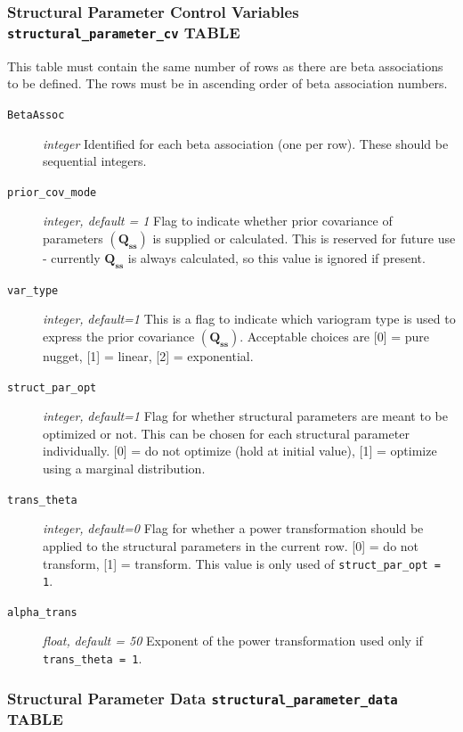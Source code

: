 \documentclass[11pt,oneside,onecolumn]{usgsreport}
\begin{document}
\begin{appendix}
\subsubsection{Structural Parameter Control Variables \texttt{structural\_parameter\_cv}
TABLE}

This table must contain the same number of rows as there are beta
associations to be defined. The rows must be in ascending order of
beta association numbers.
\begin{description}
\item [{\texttt{BetaAssoc}}] \emph{integer }Identified for each beta association
(one per row). These should be sequential integers.
\item [{\texttt{prior\_cov\_mode}}] \emph{integer, default = 1 }Flag to
indicate whether prior covariance of parameters $\left(\mathbf{Q}_{\mathbf{ss}}\right)$
is supplied or calculated. This is reserved for future use - currently
$\mathbf{Q_{ss}}$ is always calculated, so this value is ignored
if present. 
\item [{\texttt{var\_type}}] \emph{integer, }\textit{default=1}\emph{ }This
is a flag to indicate which variogram type is used to express the
prior covariance $\left(\mathbf{Q}_{\mathbf{ss}}\right)$. Acceptable
choices are {[}0{]} = pure nugget, {[}1{]} = linear, {[}2{]} = exponential.

\item [{\texttt{struct\_par\_opt}}] \emph{integer, }\textit{default=1}\emph{
}Flag for whether structural parameters are meant to be optimized
or not. This can be chosen for each structural parameter individually.
{[}0{]} = do not optimize (hold at initial value), {[}1{]} = optimize
using a marginal distribution. 
\item [{\texttt{trans\_theta}}] \emph{integer, }\textit{default=0}\emph{
}Flag for whether a power transformation should be applied to the
structural parameters in the current row. {[}0{]} = do not transform,
{[}1{]} = transform. This value is only used of \texttt{struct\_par\_opt
= 1}. 
\item [{\texttt{alpha\_trans}}] \emph{float, }\textit{default = 50} Exponent
of the power transformation used only if \texttt{trans\_theta = 1}.

\end{description}

\subsubsection{Structural Parameter Data \texttt{structural\_parameter\_data} TABLE}


\end{appendix}
\end{document}
